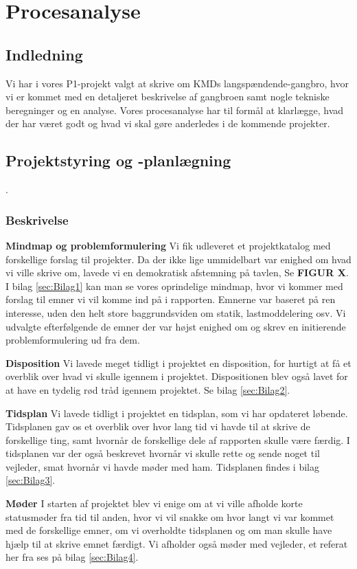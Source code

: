 \chapter{Procesanalyse}


\section{Indledning}
Vi har i vores P1-projekt valgt at skrive om KMDs langspændende-gangbro, hvor vi er kommet med en detaljeret beskrivelse af gangbroen samt nogle tekniske beregninger og en analyse. Vores procesanalyse har til formål at klarlægge, hvad der har været godt og hvad vi skal gøre anderledes i de kommende projekter.

\section{Projektstyring og -planlægning}.
\subsection{Beskrivelse}

\textbf{Mindmap og problemformulering}
Vi fik udleveret et projektkatalog med forskellige forslag til projekter. Da der ikke lige ummidelbart var enighed om hvad vi ville skrive om, lavede vi en demokratisk afstemning på tavlen, Se \textbf{FIGUR X}. I bilag \ref{sec:Bilag1} kan man se vores oprindelige mindmap, hvor vi kommer med forslag til emner vi vil komme ind på i rapporten. Emnerne  var baseret på ren interesse, uden den helt store baggrundsviden om statik, lastmoddelering osv. Vi udvalgte efterfølgende de emner der var højst enighed om og skrev en initierende problemformulering ud fra dem.

\textbf{Disposition}
Vi lavede meget tidligt i projektet en disposition, for hurtigt at få et overblik over hvad vi skulle igennem i projektet. Dispositionen blev også lavet for at have en tydelig rød tråd igennem projektet. Se bilag \ref{sec:Bilag2}.

\textbf{Tidsplan}
Vi lavede tidligt i projektet en tidsplan, som vi har opdateret løbende. Tidsplanen gav os et overblik over hvor lang tid vi havde til at skrive de forskellige ting, samt hvornår de forskellige dele af rapporten skulle være færdig. I tidsplanen var der også beskrevet hvornår vi skulle rette og sende noget til vejleder, smat hvornår vi havde møder med ham. Tidsplanen findes i bilag \ref{sec:Bilag3}.

\textbf{Møder}
I starten af projektet blev vi enige om at vi ville afholde korte statusmøder fra tid til anden, hvor vi vil snakke om hvor langt vi var kommet med de forskellige emner, om vi overholdte tidsplanen og om man skulle have hjælp til at skrive emnet færdigt. Vi afholder også møder med vejleder, et referat her fra ses på bilag \ref{sec:Bilag4}.

